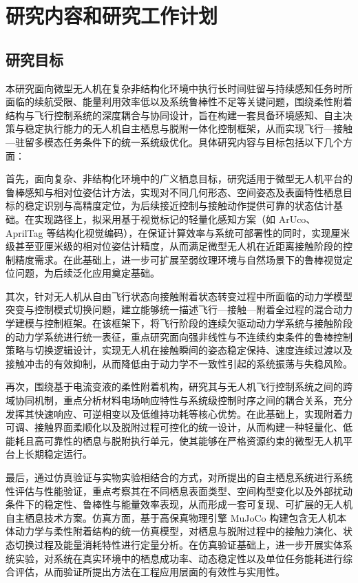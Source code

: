 \section{研究内容和研究工作计划}

\subsection{研究目标}
本研究面向微型无人机在复杂非结构化环境中执行长时间驻留与持续感知任务时所面临的续航受限、能量利用效率低以及系统鲁棒性不足等关键问题，围绕柔性附着结构与飞行控制系统的深度耦合与协同设计，旨在构建一套具备环境感知、自主决策与稳定执行能力的无人机自主栖息与脱附一体化控制框架，从而实现飞行—接触—驻留多模态任务条件下的统一系统级优化。具体研究内容与目标包括以下几个方面：

首先，面向复杂、非结构化环境中的广义栖息目标，研究适用于微型无人机平台的鲁棒感知与相对位姿估计方法，实现对不同几何形态、空间姿态及表面特性栖息目标的稳定识别与高精度定位，为后续接近控制与接触动作提供可靠的状态估计基础。在实现路径上，拟采用基于视觉标记的轻量化感知方案（如 ArUco、AprilTag 等结构化视觉编码），在保证计算效率与系统可部署性的同时，实现厘米级甚至亚厘米级的相对位姿估计精度，从而满足微型无人机在近距离接触阶段的控制精度需求\cite{joseph2024autonomous,huang2023indoor}。在此基础上，进一步可扩展至弱纹理环境与自然场景下的鲁棒视觉定位问题，为后续泛化应用奠定基础。

其次，针对无人机从自由飞行状态向接触附着状态转变过程中所面临的动力学模型突变与控制模式切换问题，建立能够统一描述飞行—接触—附着全过程的混合动力学建模与控制框架。在该框架下，将飞行阶段的连续欠驱动动力学系统与接触阶段的动力学系统进行统一表征，重点研究面向强非线性与不连续约束条件的鲁棒控制策略与切换逻辑设计，实现无人机在接触瞬间的姿态稳定保持、速度连续过渡以及接触冲击的有效抑制，从而降低由于动力学不一致性引起的系统振荡与失稳风险。

再次，围绕基于电流变液的柔性附着机构，研究其与无人机飞行控制系统之间的跨域协同机制，重点分析材料电场响应特性与系统级控制时序之间的耦合关系，充分发挥其快速响应、可逆相变以及低维持功耗等核心优势。在此基础上，实现附着力可调、接触界面柔顺化以及脱附过程可控化的统一设计，从而构建一种轻量化、低能耗且高可靠性的栖息与脱附执行单元，使其能够在严格资源约束的微型无人机平台上长期稳定运行。

最后，通过仿真验证与实物实验相结合的方式，对所提出的自主栖息系统进行系统性评估与性能验证，重点考察其在不同栖息表面类型、空间构型变化以及外部扰动条件下的稳定性、鲁棒性与能量效率表现，从而形成一套可复现、可扩展的无人机自主栖息技术方案。仿真方面，基于高保真物理引擎 MuJoCo 构建包含无人机本体动力学与柔性附着结构的统一仿真模型，对栖息与脱附过程中的接触力演化、状态切换过程及能量消耗特性进行定量分析\cite{todorov2012mujoco}。在仿真验证基础上，进一步开展实体系统实验，对系统在真实环境中的栖息成功率、动态稳定性以及单位任务能耗进行综合评估，从而验证所提出方法在工程应用层面的有效性与实用性。

